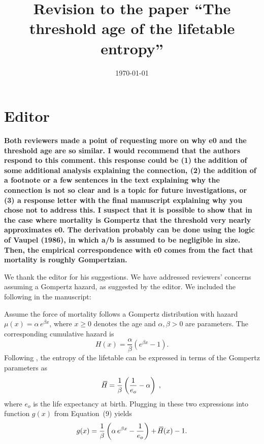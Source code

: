 \documentclass[a4paper,twoside, openright, 12pt, leqno]{article}
\title{Revision to the paper ``The threshold age of the lifetable entropy''}
\date{\today}
\newcommand*\xbar[1]{%
   \hbox{%
     \vbox{%
       \hrule height 0.5pt %
       \kern0.3ex%
       \hbox{%
         \kern-0.28em%
         \ensuremath{#1}%
         \kern-0.05em%
       }%
     }%
   }%
}
\begin{document}
\maketitle

\section*{Editor}
\textbf{Both reviewers made a point of requesting more on why e0 and the threshold age are so similar. I would recommend that the authors respond to this comment. this response could be  (1) the addition of  some additional analysis explaining the connection, (2) the addition of  a footnote or a few sentences in the text explaining why the connection is not so clear and is a topic for future investigations, or (3) a response letter with the final manuscript explaining why you chose not to address this. I suspect that it is possible to show that in the case where mortality is Gompertz that the threshold very nearly approximates e0. The derivation probably can be done using the logic of Vaupel (1986), in which a/b is assumed to be negligible in size. Then, the empirical correspondence with e0 comes from the fact that mortality is roughly Gompertzian.}
\linebreak

We thank the editor for his suggestions. We have addressed reviewers' concerns assuming a Gompertz hazard, as suggested by the editor. We included the following in the manuscript:

Assume the force of mortality follows a Gompertz distribution with hazard $\mu(x) = \alpha\,e^{\beta x}$, where $x\geq0$ denotes the age and $\alpha,\beta>0$ are parameters. The corresponding cumulative hazard is 
$$
H(x) = \frac{\alpha}{\beta}\left( e^{\beta x} - 1 \right).
$$
Following \cite{wrycza2014entropy}, the entropy of the lifetable can be expressed in terms of the Gompertz parameters as
$$
\xbar{H} = \frac{1}{\beta}\left( \frac{1}{e_o} - \alpha \right)\;,
$$
where $e_o$ is the life expectancy at birth. Plugging in these two expressions into function $g(x)$ from Equation~(9) yields
\begin{equation}
g(x) = \frac{1}{\beta} \left( \alpha\,e^{\beta x} - \frac{1}{e_o} \right)+\,\xbar{H}(x)-1.
\label{eq.gx}
\end{equation}
\end{document}
